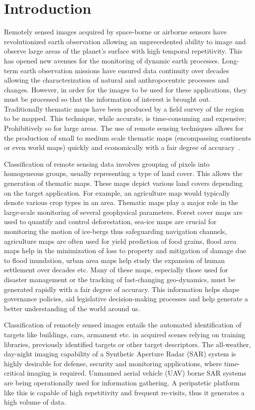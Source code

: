 \chapter{Introduction}


Remotely sensed images acquired by space-borne or airborne sensors have revolutionized earth observation allowing an unprecedented ability to image and observe large areas of the planet's surface with high temporal repetitivity. This has opened new avenues for the monitoring of dynamic earth processes. Long-term earth observation missions have ensured data continuity over decades allowing the characterization of natural and anthropocentric processes and changes. However, in order for the images to be used for these applications, they must be processed so that the information of interest is brought out. Traditionally thematic maps have been produced by a field survey of the region to be mapped. This technique, while accurate, is time-consuming and expensive; Prohibitively so for large areas. The use of remote sensing techniques allows for the production of small to medium scale thematic maps (encompassing continents or even world maps) quickly and economically with a fair degree of accuracy~\cite{gong2013finer}. 

Classification of remote sensing data involves grouping of pixels into homogeneous groups, usually representing a type of land cover. This allows the generation of thematic maps. These maps depict various land covers depending on the target application. For example, an agriculture map would typically denote various crop types in an area. Thematic maps play a major role in the large-scale monitoring of several geophysical parameters. Forest cover maps are used to quantify and control deforestation, sea-ice maps are crucial for monitoring the motion of ice-bergs thus safeguarding navigation channels, agriculture maps are often used for yield prediction of food grains, flood area maps help in the minimization of loss to property and mitigation of damage due to flood inundation, urban area maps help study the expansion of human settlement over decades etc. Many of these maps, especially those used for disaster management or the tracking of fast-changing geo-dynamics, must be generated rapidly with a fair degree of accuracy. This information helps shape governance policies, aid legislative decision-making processes and help generate a better understanding of the world around us. 


Classification of remotely sensed images entails the automated identification of targets like buildings, cars, armament etc. in acquired scenes relying on training libraries, previously identified targets or other target descriptors. The all-weather, day-night imaging capability of a Synthetic Aperture Radar (SAR) system is highly desirable for defense, security and monitoring applications, where time-critical imaging is required. Unmanned aerial vehicle (UAV) borne SAR systems are being operationally used for information gathering. A peripatetic platform like this is capable of high repetitivity and frequent re-visits, thus it generates a high volume of data. 

